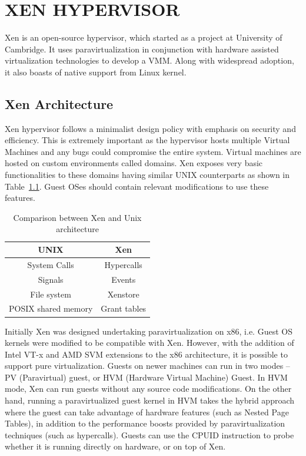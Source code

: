 \chapter{\uppercase{Xen Hypervisor}}
Xen is an open-source hypervisor, which started as a project at University of Cambridge. It uses paravirtualization in conjunction with hardware assisted virtualization technologies to develop a VMM. Along with widespread adoption, it also boasts of native support from Linux kernel. 

\section{Xen Architecture}

Xen hypervisor follows a minimalist design policy with emphasis on security and efficiency. This is extremely important as the hypervisor hosts multiple Virtual Machines and any bugs could compromise the entire system. Virtual machines are hosted on custom environments called domains. Xen exposes very basic functionalities to these domains having similar UNIX counterparts as shown in Table~\ref{tab:unixcomp}. Guest OSes should contain relevant modifications to use these features. 

\begin{table}[H]
\centering
\begin{tabular}{|c|c|}
    \hline
    UNIX & Xen \\
    \hline
    \hline
    System Calls & Hypercalls \\
    \hline
    Signals & Events \\
    \hline
    File system & Xenstore \\
    \hline
    POSIX shared memory & Grant tables  \\
    \hline
\end{tabular}
\caption[Comparison between Xen and Unix architecture]{Comparison between Xen and Unix architecture \cite{chisnall_book}}
\label{tab:unixcomp}
\end{table}

Initially Xen was designed undertaking paravirtualization on x86, i.e. Guest OS kernels were modified to be compatible with Xen. However, with the addition of Intel VT-x and AMD SVM extensions to the x86 architecture, it is possible to support pure virtualization. Guests on newer machines can run in two modes -- PV (Paravirtual) guest, or HVM (Hardware Virtual Machine) Guest. In HVM mode, Xen can run guests without any source code modifications. On the other hand, running a paravirtualized guest kernel in HVM takes the hybrid approach where the guest can take advantage of hardware features (such as Nested Page Tables), in addition to the performance boosts provided by paravirtualization techniques (such as hypercalls). Guests can use the CPUID instruction to probe whether it is running directly on hardware, or on top of Xen.

